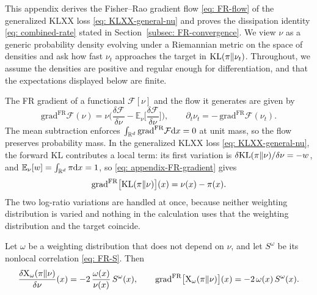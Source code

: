 \documentclass{article}
\begin{document}
This appendix derives the Fisher--Rao gradient flow \eqref{eq: FR-flow} of the generalized KLXX loss \eqref{eq: KLXX-general-nu} and proves the dissipation identity \eqref{eq: combined-rate} {\color{blue}stated in Section~\ref{subsec: FR-convergence}}. We view $\nu$ as a generic probability density evolving under a Riemannian metric on the space of densities \citep{ambrosio2008gradient,villani2009optimal} and ask how fast $\nu_t$ approaches the target in $\mathrm{KL}(\pi\|\nu_t)$.
Throughout, we assume the densities are positive and regular enough for differentiation, and that the expectations displayed below are finite.

The FR gradient of a functional $\mathcal F[\nu]$ and the flow it generates are given by
\begin{equation}
    \mathrm{grad}^{\mathrm{FR}}\mathcal F(\nu) = \nu\biggl(\frac{\delta\mathcal F}{\delta\nu} - \mathbb E_{\nu}\Big[\frac{\delta\mathcal F}{\delta\nu}\Big]\biggr),
    \qquad
    \partial_t\nu_t = -\,\mathrm{grad}^{\mathrm{FR}}\mathcal F(\nu_t).
    \label{eq: appendix-FR-gradient}
\end{equation}
The mean subtraction enforces $\int_{\mathbb R^d}\mathrm{grad}^{\mathrm{FR}}\mathcal F\mathrm{d} x = 0$ at unit mass, so the flow preserves probability mass.
In the generalized KLXX loss \eqref{eq: KLXX-general-nu},
the forward KL contributes a local term: its first variation is $\delta\mathrm{KL}(\pi\|\nu)/\delta\nu = -w$, and $\mathbb E_\nu[w] = \int_{\mathbb R^d}\pi\mathrm{d} x = 1$, so \eqref{eq: appendix-FR-gradient} gives
\begin{equation}
    \mathrm{grad}^{\mathrm{FR}}\bigl[\mathrm{KL}(\pi\|\nu)\bigr](x) = \nu(x)-\pi(x).
    \label{eq: appendix-FR-grad-KL}
\end{equation}
The two log-ratio variations are handled at once, because neither weighting distribution is varied and nothing in the calculation uses that the weighting distribution and the target coincide.

\begin{lemma}
\label{lem: appendix-variation}
Let $\omega$ be a weighting distribution that does not depend on $\nu$, and let $S^{\omega}$ be its nonlocal correlation \eqref{eq: FR-S}. Then
\begin{equation}
    \frac{\delta \mathrm{X}_\omega(\pi\|\nu)}{\delta\nu}(x) = -2\,\frac{\omega(x)}{\nu(x)}\,S^{\omega}(x),
    \qquad
    \mathrm{grad}^{\mathrm{FR}}\bigl[\mathrm{X}_\omega(\pi\|\nu)\bigr](x) = -2\,\omega(x)\,S^{\omega}(x).
    \label{eq: appendix-FR-grad-X}
\end{equation}
\end{lemma}
\end{document}
